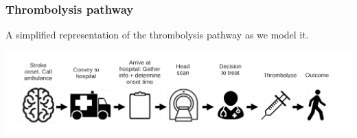 \begin{frame}
\frametitle{Thrombolysis pathway}
A simplified representation of the thrombolysis pathway as we model it.
\vspace{10mm}
\begin{center}
\includegraphics[width=1.0\textwidth]{./images/pathway}
\end{center}
\end{frame}